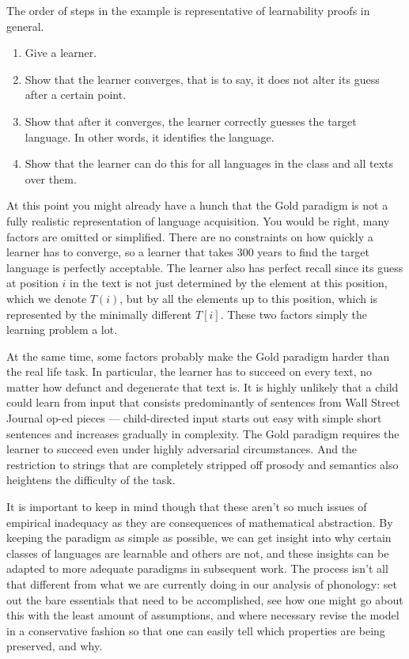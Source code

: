 %
The order of steps in the example is representative of learnability proofs in general.
%
\begin{enumerate}
    \item Give a learner.
    \item Show that the learner converges, that is to say, it does not alter its guess after a certain point.
    \item Show that after it converges, the learner correctly guesses the target language.
        In other words, it identifies the language.
    \item Show that the learner can do this for all languages in the class and all texts over them. 
\end{enumerate}

At this point you might already have a hunch that the Gold paradigm is not a fully realistic representation of language acquisition.
You would be right, many factors are omitted or simplified.
There are no constraints on how quickly a learner has to converge, so a learner that takes 300 years to find the target language is perfectly acceptable.
The learner also has perfect recall since its guess at position $i$ in the text is not just determined by the element at this position, which we denote $T(i)$, but by all the elements up to this position, which is represented by the minimally different $T[i]$.
These two factors simply the learning problem a lot.

At the same time, some factors probably make the Gold paradigm harder than the real life task.
In particular, the learner has to succeed on every text, no matter how defunct and degenerate that text is.
It is highly unlikely that a child could learn from input that consists predominantly of sentences from Wall Street Journal op-ed pieces --- child-directed input starts out easy with simple short sentences and increases gradually in complexity.
The Gold paradigm requires the learner to succeed even under highly adversarial circumstances.
And the restriction to strings that are completely stripped off prosody and semantics also heightens the difficulty of the task.

It is important to keep in mind though that these aren't so much issues of empirical inadequacy as they are consequences of mathematical abstraction.
By keeping the paradigm as simple as possible, we can get insight into why certain classes of languages are learnable and others are not, and these insights can be adapted to more adequate paradigms in subsequent work.
The process isn't all that different from what we are currently doing in our analysis of phonology: set out the bare essentials that need to be accomplished, see how one might go about this with the least amount of assumptions, and where necessary revise the model in a conservative fashion so that one can easily tell which properties are being preserved, and why.


